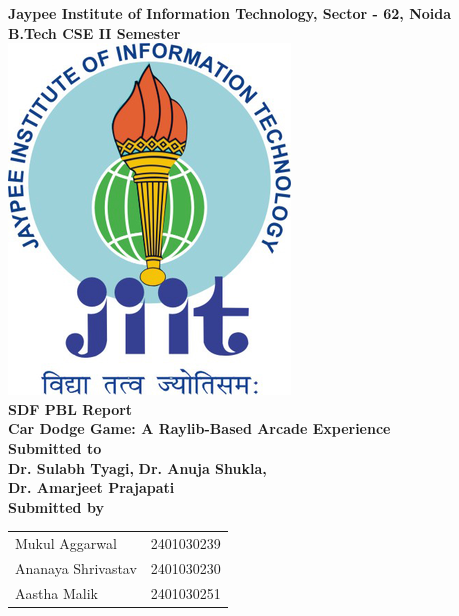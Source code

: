 \documentclass[12pt,a4paper]{article}
\begin{document}
\begin{titlepage}
    \centering
    \Huge
    \textbf{Jaypee Institute of Information Technology, Sector - 62, Noida} \\
    \vspace{0.5cm}
    \Large
    \textbf{B.Tech CSE II Semester} \\
    \vspace{1cm}
    \vspace*{\fill}
    \includegraphics[scale=3]{jiit_logo} \\
    \vspace{1.5cm}
    \Huge
    \textbf{SDF PBL Report} \\
    \Large
    \textbf{Car Dodge Game: A Raylib-Based Arcade Experience} \\
    \vspace{1cm}
    \Large
    \textbf{Submitted to} \\
    \textbf{Dr. Sulabh Tyagi,}
    \textbf{Dr. Anuja Shukla,}\\
    \textbf{Dr. Amarjeet Prajapati} \\
    \vspace{1cm}
    \textbf{Submitted by} \\
    \vspace{0.5cm}
    \begin{tabular}{ll}
        Mukul Aggarwal & 2401030239 \\
        Ananaya Shrivastav & 2401030230 \\
        Aastha Malik & 2401030251 \\
    \end{tabular}
    \vspace*{\fill}
    \normalsize
\end{titlepage}
\end{document}
